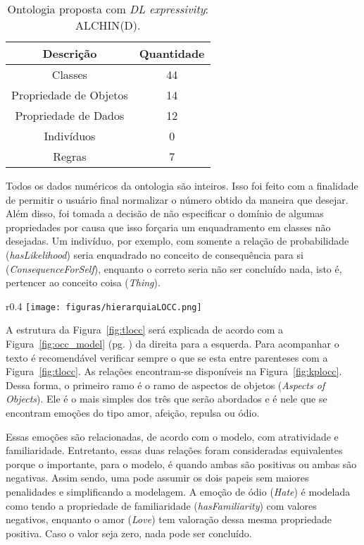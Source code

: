 \begin{table}
	\caption{Ontologia proposta com \emph{DL expressivity}: ALCHIN(D).}
	\label{tab:oa:geral}
	\begin{center}
	\begin{tabular}{|c|c|}
		\hline
		Descrição & Quantidade \\ \hline
		Classes &  44 		\\ \hline
		Propriedade de Objetos & 14 \\ \hline
		Propriedade de Dados & 12 \\ \hline
		Indivíduos &  0		\\ \hline
		Regras & 7 \\ \hline
	\end{tabular}
	\end{center}
\end{table}

Todos os dados numéricos da ontologia são inteiros. Isso foi feito com a
finalidade de permitir o usuário final normalizar\dev{} o número obtido da
maneira que desejar. Além disso, foi tomada a decisão de não especificar o
domínio de algumas propriedades por causa que isso forçaria um enquadramento
em classes não desejadas. Um indivíduo, por exemplo, com somente a relação
de probabilidade (\emph{hasLikelihood}) seria enquadrado no conceito de
consequência para si (\emph{ConsequenceForSelf}), enquanto o correto seria não
ser concluído nada, isto é, pertencer ao conceito coisa (\emph{Thing}).

\begin{wrapfigure}{r}{0.4\textwidth}
  \texttt{[image: figuras/hierarquiaLOCC.png]}
  \caption{Taxonomia da ontologia proposta baseado no modelo.}
  \label{fig:tlocc}
\end{wrapfigure}

A estrutura da Figura~\ref{fig:tlocc} será explicada de acordo com a
Figura~\ref{fig:occ_model} (pg. \pageref{fig:occ_model}) da direita para a
esquerda. Para acompanhar o texto é recomendável verificar sempre o que se
esta entre parenteses com a Figura~\ref{fig:tlocc}. As relações encontram-se
disponíveis na Figura~\ref{fig:kplocc}. Dessa forma, o primeiro ramo
é o ramo de aspectos de objetos (\emph{Aspects of Objects}). Ele é o mais
simples dos três que serão abordados e é nele que se encontram emoções do tipo
amor, afeição, repulsa ou ódio.

Essas emoções são relacionadas, de acordo com o modelo, com atratividade e
familiaridade. Entretanto, essas duas relações foram consideradas
equivalentes porque o importante, para o modelo, é quando ambas são positivas
ou ambas são negativas. Assim sendo, uma pode assumir os dois papeis sem
maiores penalidades e simplificando a modelagem. A emoção de ódio
(\emph{Hate}) é modelada como tendo a propriedade de familiaridade
(\emph{hasFamiliarity}) com valores negativos, enquanto o amor (\emph{Love})
tem valoração dessa mesma propriedade positiva. Caso o valor seja zero,
nada pode ser concluído.

